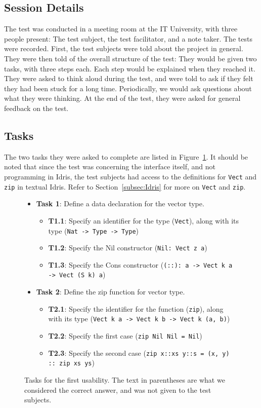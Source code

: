 \subsection{Session Details}
The test was conducted in a meeting room at the IT University, with three
people present: The test subject, the test facilitator, and a note taker. The
tests were recorded. First, the test subjects were told about the project in
general. They were then told of the overall structure of the test: They would
be given two tasks, with three steps each. Each step would be explained when
they reached it. They were asked to think aloud during the test, and were told to
ask if they felt they had been stuck for a long time. Periodically, we would
ask questions about what they were thinking. At the end of the test, they were asked for general feedback on the test.

\subsection{Tasks}
The two tasks they were asked to complete are listed in Figure~\ref{figure:first_tasks}.
It should be noted that since the test was concerning the interface itself, and
not programming in Idris, the test subjects had access to the definitions for \texttt{Vect} and \texttt{zip} in textual Idris. Refer to Section~\ref{subsec:Idris}
for more on \texttt{Vect} and \texttt{zip}.

\begin{figure}
\centering
\begin{itemize}
	\item \textbf{Task 1}: Define a data declaration for the vector type.
	\begin{itemize}
		\item \textbf{T1.1}: Specify an identifier for the type (\texttt{Vect}), along with its type (\texttt{Nat -> Type -> Type})
		\item \textbf{T1.2}: Specify the Nil constructor (\texttt{Nil: Vect z a})
		\item \textbf{T1.3}: Specify the Cons constructor (\texttt{(::): a -> Vect k a -> Vect (S k) a})
	\end{itemize}
	\item \textbf{Task 2}: Define the zip function for vector type.
	\begin{itemize}
		\item \textbf{T2.1}: Specify the identifier for the function (\texttt{zip}), along with its type (\texttt{Vect k a -> Vect k b -> Vect k (a, b)})
		\item \textbf{T2.2}: Specify the first case (\texttt{zip Nil Nil = Nil})
		\item \textbf{T2.3}: Specify the second case (\texttt{zip x::xs y::s = (x, y) :: zip xs ys})
	\end{itemize}
\end{itemize}
\caption{Tasks for the first usability. The text in parentheses are what we considered the correct answer, and was not given to the test subjects.}
\label{figure:first_tasks}
\end{figure}

